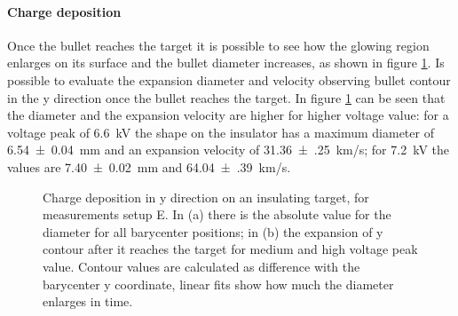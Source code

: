 \paragraph{Charge deposition}
Once the bullet reaches the target it is possible to see how the glowing region enlarges on its surface and the bullet diameter increases, as shown in figure \ref{fig:elio_c_ylim}. Is possible to evaluate the expansion diameter and velocity observing bullet contour in the y direction once the bullet reaches the target. In figure \ref{fig:elio_c_ylim} can be seen that the diameter and the expansion velocity are higher for higher voltage value: for a voltage peak of \SI{6.6}{\kilo\volt} the shape on the insulator has a maximum diameter of \SI{6.54(4)}{\milli\meter} and an expansion velocity of \SI{31.36(25)}{\kilo\meter/\second}; for \SI{7.2}{\kilo\volt} the values are \SI{7.40(2)}{\milli\meter} and \SI{64.04(39)}{\kilo\meter/\second}. %
\begin{figure}
 \centering
 \hfill
 \caption{Charge deposition in y direction on an insulating target, for measurements setup E. In (a) there is the absolute value for the diameter for all barycenter positions; in (b) the expansion of y contour after it reaches the target for medium and high voltage peak value. Contour values are calculated as difference with the barycenter y coordinate, linear fits show how much the diameter enlarges in time.}
 \label{fig:elio_c_ylim}
\end{figure}


